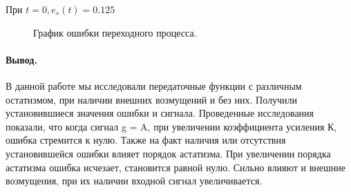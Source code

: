 \documentclass[a4paper, 11pt]{article}
\begin{document}
\normalsize{При $t=0, e_s(t)=0.125$}

\begin{figure}[h]
    \caption{График ошибки переходного процесса.}
    \label{tree}
\end{figure}
\newpage
\paragraph{Вывод.} В данной работе мы исследовали передаточные функции с различным остатизмом, при наличии внешних возмущений и без них. Получили установившиеся значения ошибки и сигнала. Проведенные исследования показали, что когда сигнал g = A, при увеличении коэффициента усиления К, ошибка стремится к нулю. Также на факт наличия или отсутствия установившейся ошибки влияет порядок астатизма. При увеличении порядка астатизма ошибка исчезает, становится равной нулю. Сильно влияют и внешние возмущения, при их наличии входной сигнал увеличивается.
\end{document}
